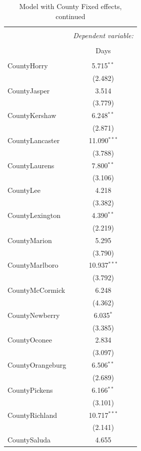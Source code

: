 \documentclass[11pt, oneside]{article}   	%
\theoremstyle{ModifiedStyle}
\begin{document}
		\begin{table}[H] \centering
			\caption{Model with County Fixed effects, continued}
			\small
			\begin{tabular}{@{\extracolsep{5pt}}lc}
			\\[-1.8ex]\hline
			\hline \\[-1.8ex]
			 & \multicolumn{1}{c}{\textit{Dependent variable:}} \\
			\cline{2-2}
			\\[-1.8ex] & Days \\
			\hline \\[-1.8ex]
			CountyHorry & 5.715$^{**}$ \\
			& (2.482) \\
			CountyJasper & 3.514 \\
			& (3.779) \\
			CountyKershaw & 6.248$^{**}$ \\
			& (2.871) \\
			CountyLancaster & 11.090$^{***}$ \\
			& (3.788) \\
			CountyLaurens & 7.800$^{**}$ \\
			& (3.106) \\
			CountyLee & 4.218 \\
			& (3.382) \\
			CountyLexington & 4.390$^{**}$ \\
			& (2.219) \\
			CountyMarion & 5.295 \\
			& (3.790) \\
			CountyMarlboro & 10.937$^{***}$ \\
			& (3.792) \\
			CountyMcCormick & 6.248 \\
			& (4.362) \\
			CountyNewberry & 6.035$^{*}$ \\
			& (3.385) \\
			CountyOconee & 2.834 \\
			& (3.097) \\
			CountyOrangeburg & 6.506$^{**}$ \\
			& (2.689) \\
			CountyPickens & 6.166$^{**}$ \\
			& (3.101) \\
			CountyRichland & 10.717$^{***}$ \\
			& (2.141) \\
			CountySaluda & 4.655 \\

\end{tabular}
\end{table}
\end{document}
